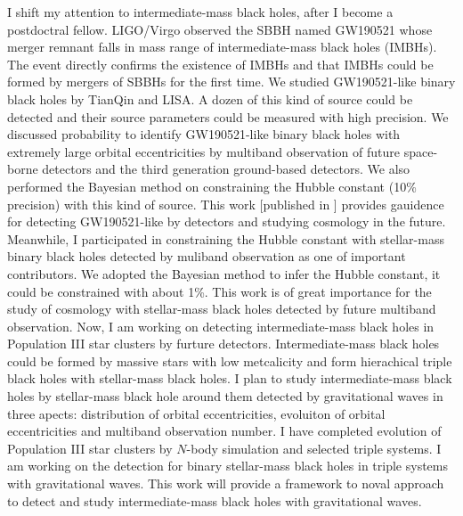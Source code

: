 \documentclass[12pt,a4paper,sans]{article}%
\begin{document}
I shift my attention to intermediate-mass black holes, after I become a postdoctral fellow. LIGO/Virgo observed the SBBH named
GW190521 whose merger remnant falls in mass range of intermediate-mass black holes (IMBHs). The event directly confirms the existence of
IMBHs and that IMBHs could be formed by mergers of SBBHs for the first time. We studied GW190521-like binary black holes by TianQin and LISA. A dozen of this kind of
source could be detected and their source parameters could be measured with high precision. We discussed probability to identify GW190521-like binary black holes with extremely large orbital eccentricities by
multiband observation of future space-borne detectors and the third generation ground-based detectors. We also performed the Bayesian method
on constraining the Hubble constant (10\% precision) with this kind of source. This work [published in ] provides
gauidence for detecting GW190521-like by detectors and studying cosmology in the future. Meanwhile, I participated in constraining the Hubble
constant with stellar-mass binary black holes detected by muliband observation as one of important contributors. We
adopted the Bayesian method to infer the Hubble constant, it could be constrained with about 1\%. This work is of great
importance for the study of cosmology with stellar-mass black holes detected by future multiband observation. Now, I am working on
detecting intermediate-mass black holes in Population III star clusters by furture detectors. Intermediate-mass black
holes could be formed by massive stars with low metcalicity and form hierachical triple black holes with stellar-mass
black holes. I plan to study intermediate-mass black holes by stellar-mass black hole around them detected by gravitational waves in three apects: distribution of orbital
eccentricities, evoluiton of orbital eccentricities and multiband observation number. I have completed evolution of
Population III star clusters by $N$-body simulation and selected triple systems. I am working on the detection for 
binary stellar-mass black holes in triple systems with gravitational waves. This work will provide a framework to noval
approach to detect and study intermediate-mass black holes with gravitational waves.
\end{document}

